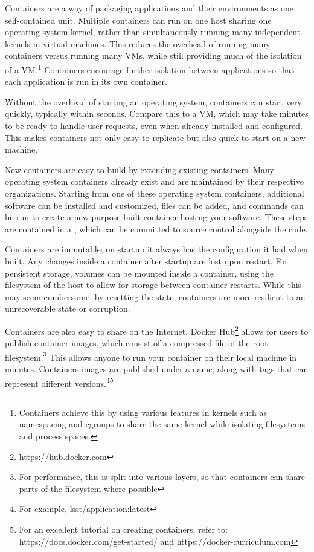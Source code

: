 \documentclass[11pt,twoside]{article}
\begin{document}
Containers are a way of packaging applications and their environments as one self-contained unit.
Multiple containers can run on one host sharing one operating system kernel, rather than simultaneously
running many independent kernels in virtual machines.  This reduces the overhead of running many containers
versus running many VMs, while still providing much of the isolation of a VM.\footnote{Containers
achieve this by using various features in kernels such as namespacing and cgroups
to share the same kernel while isolating filesystems and process spaces.}  Containers
encourage further isolation between applications so that each application is run in its
own container.

Without the overhead of starting an operating system, containers can start very quickly,
typically within seconds.  Compare this to a VM, which may take minutes to be ready to handle
user requests, even when already installed and configured. This makes containers not only
easy to replicate but also quick to start on a new machine.

New containers are easy to build by extending existing containers.  Many operating
system containers already exist and are maintained by their respective organizations.
Starting from one of these operating system containers, additional software can be
installed and customized, files can be added, and commands can be run to create a
new purpose-built container hosting your software.  These steps are contained in a
, which can be committed to source control alongside the code.

Containers are immutable; on startup it always has the configuration it had when built.
Any changes inside a container after startup are lost upon restart.  For persistent storage,
volumes can be mounted inside a container, using the filesystem of the host
to allow for storage between container restarts.  While this may seem cumbersome,
by resetting the state, containers are more resilient to an unrecoverable state or corruption.

Containers are also easy to share on the Internet.  Docker Hub\footnote{https://hub.docker.com}
allows for users to publish container images, which consist of
a compressed  file of the root filesystem.\footnote{For performance, this is split into
various layers, so that containers can share parts of the filesystem where possible} This allows
anyone to run your container on their local machine in minutes.  Containers images are published under
a name, along with tags that can represent different versions.\footnote{For example, lsst/application:latest}\footnote{
For an excellent tutorial on creating containers, refer to: https://docs.docker.com/get-started/
and https://docker-curriculum.com}
\end{document}
